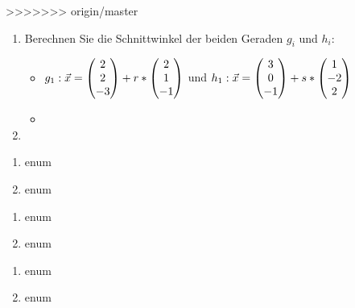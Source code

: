 >>>>>>> origin/master



\begin{enumerate}
	\item Berechnen Sie die Schnittwinkel der beiden Geraden $g_i$ und $h_i$:
	\begin{itemize}
		\item $g_1: \vec x = \begin{pmatrix} 2\\2\\-3 \end{pmatrix} + r*\begin{pmatrix} 2\\1\\-1 \end{pmatrix}$ und $h_1: \vec x = \begin{pmatrix} 3\\0\\-1 \end{pmatrix} + s* \begin{pmatrix} 1\\-2\\2 \end{pmatrix}$
		\item
	\end{itemize}
	\item
\end{enumerate}

\begin{enumerate}
	\item enum
	\item	enum
\end{enumerate}

\begin{enumerate}
	\item enum
	\item	enum
\end{enumerate}


\begin{enumerate}
	\item enum
	\item	enum
\end{enumerate}




